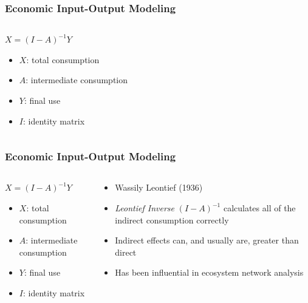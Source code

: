 \documentclass[aspectratio=169]{beamer}
\begin{document}
\begin{frame}
  \frametitle{Economic Input-Output Modeling}
\begin{columns}
\begin{column}{0.5\textwidth}
\begin{center}
$X = (I - A)^{-1}Y$
\\ 
\begin{itemize}
\item $X$: total consumption \pause
\item $A$: intermediate consumption \pause
\item $Y$: final use \pause
\item $I$: identity matrix 
\end{itemize}
\end{center}
\end{column}
\begin{column}{0.5\textwidth}  %
\end{column}
\end{columns}
\end{frame}


\begin{frame}
  \frametitle{Economic Input-Output Modeling}
\begin{columns}
\begin{column}{0.5\textwidth}
\begin{center}
$X = (I - A)^{-1}Y$
\\ 
\begin{itemize}
\item $X$: total consumption 
\item $A$: intermediate consumption
\item $Y$: final use 
\item $I$: identity matrix 
\end{itemize}
\end{center}
\end{column}
\begin{column}{0.5\textwidth}  %
  \begin{itemize}
  \item Wassily Leontief (1936)
  \item \textit{Leontief Inverse} $(I - A)^{-1}$ calculates all of the indirect
  consumption correctly \pause
  \item Indirect effects can, and usually are, greater than direct \pause
  \item Has been influential in ecosystem network analysis
  \end{itemize}
\end{column}
\end{columns}
\end{frame}
\end{document}
